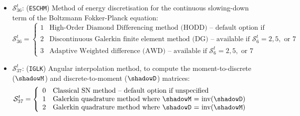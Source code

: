 \begin{itemize}
\item $\mathcal{S}^{t}_{36}$: ({\tt ESCHM}) Method of energy discretisation for the continuous slowing-down term of the Boltzmann Fokker-Planck equation:
\begin{displaymath}
\mathcal{S}^{t}_{36} = \left\{
\begin{array}{rl}
 1 & \textrm{High-Order Diamond Differencing method (HODD) -- default option if unspecified} \\
 2 & \textrm{Discontinuous Galerkin finite element method (DG) -- available if $\mathcal{S}^{t}_{6} = 2, 5,$ or $7$}\\
 3 & \textrm{Adaptive Weighted difference (AWD) -- available if $\mathcal{S}^{t}_{6} = 2, 5,$ or $7$}
\end{array} \right.
\end{displaymath}

\item $\mathcal{S}^{t}_{37}$: ({\tt IGLK}) Angular interpolation method, to compute the moment-to-discrete ($\shadowM$)
and discrete-to-moment ($\shadowD$) matrices:
\begin{displaymath}
\mathcal{S}^{t}_{37} = \left\{
\begin{array}{rl}
 0 & \textrm{Classical SN method -- default option if unspecified} \\
 1 & \textrm{Galerkin quadrature method where $\shadowM$ = inv($\shadowD$)}\\
 2 & \textrm{Galerkin quadrature method where $\shadowD$ = inv($\shadowM$)}
\end{array} \right.
\end{displaymath}

\end{itemize}

\clearpage

